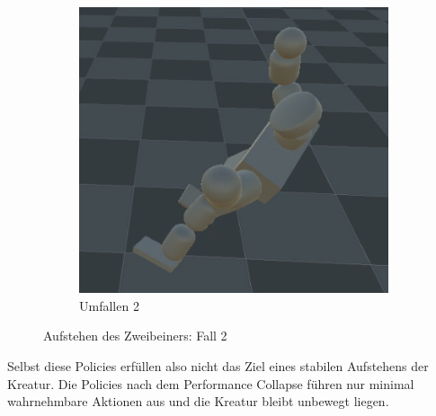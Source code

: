 \begin{figure}
\begin{subfigure}[b]{0.18\textwidth}
	\end{subfigure}
	\begin{subfigure}[b]{0.18\textwidth}
	\centering
	\includegraphics[width=\textwidth]{resources/img/2BAufstehen/Fall2_umfallen}
	\caption{Umfallen 2}
\end{subfigure}
	\caption{Aufstehen des Zweibeiners: Fall 2}
	\label{fig:2BAufstehen2}
\end{figure}
Selbst diese Policies erfüllen also nicht das Ziel eines stabilen Aufstehens der Kreatur.
Die Policies nach dem Performance Collapse führen nur minimal wahrnehmbare Aktionen aus und die Kreatur bleibt unbewegt liegen. 





